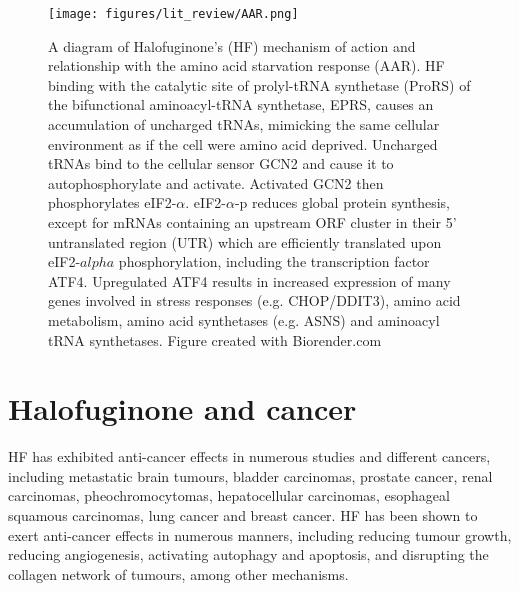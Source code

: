 \begin{figure}[htb]
\centering
\texttt{[image: figures/lit\_review/AAR.png]}
\caption[Halofuginone and the amino acid response diagram]{A diagram of Halofuginone's (HF) mechanism of action and relationship with the amino acid starvation response (AAR).
HF binding with the catalytic site of prolyl-tRNA synthetase (ProRS) of the bifunctional aminoacyl-tRNA synthetase, EPRS, causes an accumulation of uncharged tRNAs, mimicking the same cellular environment as if the cell were amino acid deprived.
Uncharged tRNAs bind to the cellular sensor GCN2 and cause it to autophosphorylate and activate.
Activated GCN2 then phosphorylates eIF2-$\alpha$.
eIF2-$\alpha$-p reduces global protein synthesis, except for mRNAs containing an upstream ORF cluster in their 5' untranslated region (UTR) which are efficiently translated upon eIF2-$alpha$ phosphorylation\cite{ye2015gcn2}, including the transcription factor ATF4.
Upregulated ATF4 results in increased expression of many genes involved in stress responses (e.g. CHOP/DDIT3), amino acid metabolism, amino acid synthetases (e.g. ASNS) and aminoacyl tRNA synthetases.
Figure created with Biorender.com
}
\label{fig:HF_AAR}\end{figure}


\section{Halofuginone and cancer}\label{sec:HF_cancer}

HF has exhibited anti-cancer effects in numerous studies and different cancers, including metastatic brain tumours, bladder carcinomas, prostate cancer, renal carcinomas, pheochromocytomas, hepatocellular carcinomas, esophageal squamous carcinomas, lung cancer and breast cancer\cite{abramovitch2004halofuginone, elkin1999inhibition, gavish2002growth, genin2008myofibroblasts, gross2003treatment, nagler2004suppression, wang2020significance, demiroglu2020anticarcinogenic, xia2018halofuginone}.
HF has been shown to exert anti-cancer effects in numerous manners, including reducing tumour growth, reducing angiogenesis, activating autophagy and apoptosis, and disrupting the collagen network of tumours, among other mechanisms.

